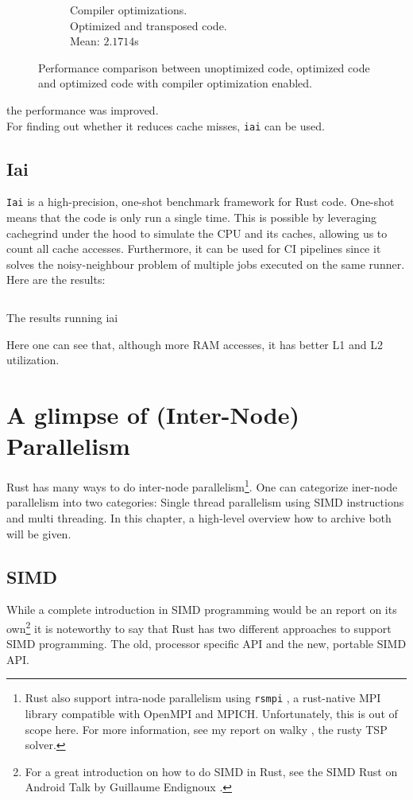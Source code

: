 \begin{figure}[H]
\begin{subfigure}{.5\textwidth}
  \caption{Compiler optimizations.\\\hspace*{0.6cm}Optimized and transposed code.\\\hspace*{0.6cm}Mean: $2.1714$s}
\end{subfigure}%
  \caption{Performance comparison between unoptimized code, optimized code and optimized code with compiler optimization enabled.}
\end{figure}

the performance was improved.\\

For finding out whether it reduces cache misses, \texttt{iai} can be used.

\subsection{Iai}
\texttt{Iai} \cite{iai} is a high-precision, one-shot benchmark framework for Rust code. One-shot means that the code is only run a single time. This is possible by leveraging cachegrind \cite{cachegrind} under the hood to simulate the CPU and its caches, allowing us to count all cache accesses. Furthermore, it can be used for \ac{CI} pipelines since it solves the noisy-neighbour problem of multiple jobs executed on the same runner. Here are the results:

\begin{listing}[H]
  \inputminted{text}{./assets/iai.txt}
\caption{The results running iai}
\end{listing}

Here one can see that, although more RAM accesses, it has better L1 and L2 utilization.

\section{A glimpse of (Inter-Node) Parallelism}
Rust has many ways to do inter-node parallelism\footnote{Rust also support intra-node parallelism using \texttt{rsmpi} \cite{rsmpi}, a rust-native MPI library compatible with OpenMPI and MPICH. Unfortunately, this is out of scope here. For more information, see my report on walky \cite{walky}, the rusty TSP solver.}. One can categorize iner-node parallelism into two categories: Single thread parallelism using SIMD instructions and multi threading. In this chapter, a high-level overview how to archive both will be given.

\subsection{SIMD}
While a complete introduction in \ac{SIMD} programming would be an report on its own\footnote{For a great introduction on how to do \ac{SIMD} in Rust, see the \ac{SIMD} Rust on Android Talk by Guillaume Endignoux \cite{simdtalk}.} it is noteworthy to say that Rust has two different approaches to support \ac{SIMD} programming. The old, processor specific API and the new, portable SIMD API.

